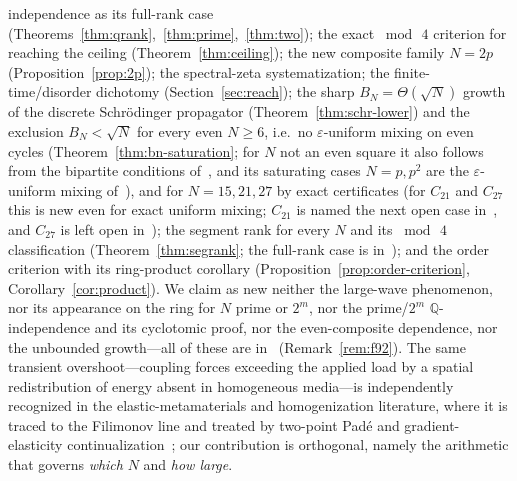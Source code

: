 \documentclass[11pt,reqno]{amsart}
\theoremstyle{plain}
\theoremstyle{definition}
\newcommand{\Q}{\mathbb{Q}}
\begin{document}
independence as its full-rank case (Theorems~\ref{thm:qrank},~\ref{thm:prime},~\ref{thm:two}); the exact $\bmod\,4$ criterion for reaching
the ceiling (Theorem~\ref{thm:ceiling}); the new composite family $N=2p$ (Proposition~\ref{prop:2p}); the
spectral-zeta systematization; the finite-time/disorder dichotomy (Section~\ref{sec:reach}); the
sharp $B_N=\Theta(\sqrt N)$ growth of the discrete Schr\"odinger propagator
(Theorem~\ref{thm:schr-lower}) and the exclusion $B_N<\sqrt N$ for every even $N\ge6$, i.e.\ no
$\varepsilon$-uniform mixing on even cycles (Theorem~\ref{thm:bn-saturation}; for $N$ not an even square it
also follows from the bipartite conditions of~\cite{Monterde}, and its saturating cases $N=p,p^2$ are the
$\varepsilon$-uniform mixing of~\cite{GMR17,CaoZhu26}), and for $N=15,21,27$ by exact certificates (for $C_{21}$ and $C_{27}$ this is new
even for exact uniform mixing; $C_{21}$ is named the next open case in~\cite{GPY}, and $C_{27}$ is left open in~\cite{CaoZhu26}); the segment rank for every $N$ and its $\bmod\,4$
classification (Theorem~\ref{thm:segrank}; the full-rank case is in~\cite{GKSS12}); and the
order criterion with its ring-product corollary (Proposition~\ref{prop:order-criterion},
Corollary~\ref{cor:product}). We claim as new neither the large-wave phenomenon, nor its appearance on the
ring for $N$ prime or $2^m$, nor the prime/$2^m$ $\Q$-independence and its cyclotomic proof, nor the
even-composite dependence, nor the unbounded growth---all of these are in~\cite{F92} (Remark~\ref{rem:f92}). The same
transient overshoot---coupling forces exceeding the applied load by a spatial redistribution of energy
absent in homogeneous media---is independently recognized in the elastic-metamaterials and
homogenization literature, where it is traced to the Filimonov line and treated by two-point Pad\'e and
gradient-elasticity continualization~\cite{AAW,ASW12,ADK13,AAD21}; our contribution is orthogonal, namely the
arithmetic that governs \emph{which} $N$ and \emph{how large}.
\end{document}
